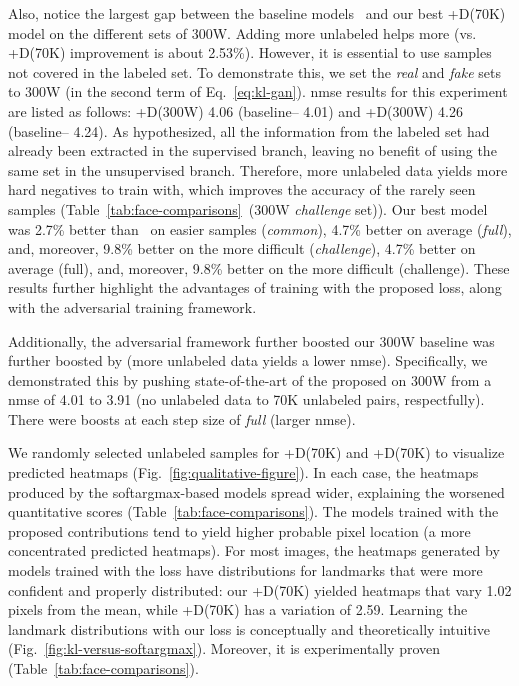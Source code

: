 \documentclass[10pt,twocolumn,letterpaper]{article}
\begin{document}
Also, notice the largest gap between the baseline models~\cite{dong2018supervision} and our best +D(70K) model on the different sets of 300W. Adding more unlabeled helps more (\ie  vs. +D(70K) improvement is about 2.53\%). However, it is essential to use samples not covered in the labeled set. To demonstrate this, we set the \textit{real} and \textit{fake} sets to 300W (\ie  in the second term of Eq.~\ref{eq:kl-gan}). \gls{nmse} results for this experiment are listed as follows: +D(300W) 4.06 (baseline-- 4.01) and +D(300W) 4.26 (baseline-- 4.24). As hypothesized, all the information from the labeled set had already been extracted in the supervised branch, leaving no benefit of using the same set in the unsupervised branch. Therefore, more unlabeled data yields more hard negatives to train with, which improves the accuracy of the rarely seen samples (Table~\ref{tab:face-comparisons}~(300W \textit{challenge} set)). Our best model was 2.7\% better than~\cite{dong2018supervision} on easier samples (\ie \textit{common}), 4.7\% better on average (\ie \textit{full}), and, moreover, 9.8\% better on the more difficult (\ie \textit{challenge}), 4.7\% better on average (full), and, moreover, 9.8\% better on the more difficult (challenge). These results further highlight the advantages of training with the proposed  loss, along with the adversarial training framework.



Additionally, the adversarial framework further boosted our 300W baseline was further boosted by (\ie more unlabeled data yields a lower \gls{nmse}). Specifically, we demonstrated this by pushing state-of-the-art of the proposed on 300W from a \gls{nmse} of 4.01 to 3.91 (\ie no unlabeled data to 70K unlabeled pairs, respectfully). There were boosts at each step size of \textit{full} (\ie larger   \gls{nmse}).

We randomly selected unlabeled samples for +D(70K) and +D(70K) to visualize predicted heatmaps (Fig.~\ref{fig:qualitative-figure}). In each case, the heatmaps produced by the softargmax-based models spread wider, explaining the worsened quantitative scores (Table~\ref{tab:face-comparisons}). The models trained with the proposed contributions tend to yield higher probable pixel location (\ie a more concentrated predicted heatmaps). For most images, the heatmaps generated by models trained with the  loss have distributions for landmarks that were more confident and properly distributed: our +D(70K) yielded heatmaps that vary 1.02 pixels from the mean, while +D(70K) has a variation of 2.59. Learning the landmark distributions with our  loss is conceptually and theoretically intuitive (Fig.~\ref{fig:kl-versus-softargmax}). Moreover, it is experimentally proven (Table~\ref{tab:face-comparisons}).
\end{document}
